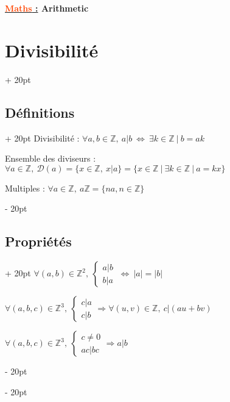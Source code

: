 \documentclass[a4paper, 12pt, twoside]{article}
\renewcommand{\emph}{\textcolor{ff4500}}
\newcommand{\Z}{\mathbb{Z}} %
\newcommand{\ssi}{\ \Leftrightarrow \ }
\newcommand{\abs}[1]{\left\lvert #1 \right\rvert} %
\newcommand{\eqsys}[2]{\begin{cases} #1 \\ #2 \end{cases}}
\newcommand{\ind}[1][20pt]{\advance\leftskip + #1}
\newcommand{\deind}[1][20pt]{\advance\leftskip - #1}
\newenvironment{indt}[2][20pt]{#2 \par \ind[#1]}{\par \deind} %
\newcommand{\thetitle}[2]{\begin{center}\textbf{{\LARGE \underline{\emph{#1} :}} {\Large #2}}\end{center}}
\begin{document}
    \thetitle{Maths}{Arithmetic}
    
    
    \tableofcontents
    \newpage
    
    
    \begin{indt}{\section{Divisibilité}}
        
        \begin{indt}{\subsection{Définitions}}
            Divisibilité : $\forall a, b \in \Z,\ a|b \ssi \exists k \in \Z\ |\ b = ak$
            
            \vspace{6pt}
            
            Ensemble des diviseurs : $\forall a \in \Z,\ \mathcal D(a) = \{ x \in \Z,\ x|a \} = \{ x \in \Z\ |\ \exists k \in \Z\ |\ a = kx \}$
            
            \vspace{6pt}
            
            Multiples : $\forall a \in \Z,\ a\Z = \{ na, n \in \Z \}$
        \end{indt}
        
        \vspace{12pt}
        
        \begin{indt}{\subsection{Propriétés}}
            $
                \forall (a, b) \in \Z^2,\
                \eqsys{a|b}{b|a}
                \ssi \abs a = \abs b
            $
            
            \vspace{6pt}
            
            $
                \forall (a, b, c) \in \Z^3,\
                \eqsys{c|a}{c|b}
                \Rightarrow \forall (u, v) \in \Z,\ c|(au + bv)
            $
            
            \vspace{6pt}
            
            $
                \forall (a, b, c) \in \Z^3,\
                \eqsys{c \neq 0}{ac|bc}
                \Rightarrow a|b
            $
        \end{indt}
        

\end{indt}
\end{document}
